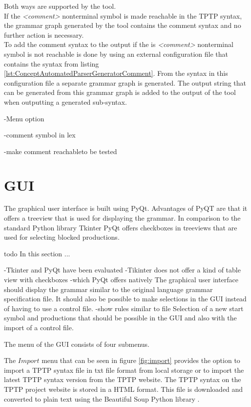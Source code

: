 Both ways are supported by the tool.\\
If the \textit{<comment>} nonterminal symbol is made reachable in the \ac{TPTP} syntax, the grammar graph generated by the tool contains the comment syntax and no further action is necessary.\\
To add the comment syntax to the output if the is \textit{<comment>} nonterminal symbol is not reachable is done by using an external configuration file that contains the syntax from listing \ref{lst:ConceptAutomatedParserGeneratorComment}.
From the syntax in this configuration file a separate grammar graph is generated. The output string that can be generated from this grammar graph is added to the output of the tool when outputting a generated sub-syntax.

-Menu option

-comment symbol in lex

-make comment reachableto be tested
\section{GUI}\label{sec:ConceptGUI}
The graphical user interface is built using PyQt. Advantages of PyQT are that it offers a treeview that is used for displaying the grammar. In comparison to the standard Python library Tkinter PyQt offers checkboxes in treeviews \cite{Tkinter} that are used for selecting blocked productions.

todo
In this section ...
 
-Tkinter and PyQt have been evaluated
-Tikinter does not offer a kind of table view with checkboxes
-which PyQt offers natively
The graphical user interface should display the grammar similar to the original language grammar specification file.
It should also be possible to make selections in the GUI instead of having to use a control file. 
-show rules similar to file
Selection of a new start symbol and productions that should be possible in the GUI and also with the import of a control file.

The menu of the GUI consists of four submenus.

The $Import$ menu that can be seen in figure \ref{fig:import} provides the option to import a TPTP syntax file in txt file format from local storage or to import the latest TPTP syntax version from the TPTP website.
The TPTP syntax on the TPTP project website is stored in a HTML format.
This file is downloaded and converted to plain text using the Beautiful Soup Python library \cite{BeautifulSoup}.

